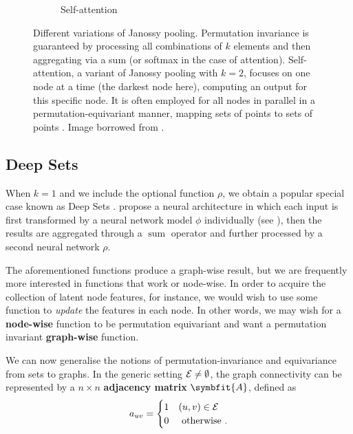 \begin{figure}[th]
\begin{subfigure}[h]{0.46\textwidth}
		\vspace{-0.8cm}
		\caption{Self-attention}
		\label{fig:Janossy_K2Att}
	\end{subfigure} 
	\caption{Different variations of Janossy pooling. Permutation invariance is guaranteed by processing all combinations of $k$ elements and then aggregating via a sum (or softmax in the case of attention). Self-attention, a variant of Janossy pooling with $k=2$, focuses on one node at a time (the darkest node here), computing an output for this specific node. It is often employed for all nodes in parallel in a permutation-equivariant manner, mapping sets of points to sets of points \parencite{Lee2018}. Image borrowed from \textcite{wagstaff2022universal}.}
	\label{fig:k12}
\end{figure}

\subsection{Deep Sets}\label{ssec:deep-sets}

When $k=1$ and we include the optional function $\rho$, we obtain a popular special case known as Deep Sets \parencite{zaheer2017deep}. \citeauthor{zaheer2017deep} propose a neural architecture in which each input is first transformed by a neural network model $\phi$ individually (see ), then the results are aggregated through a $\operatorname{sum}$ operator and further processed by a second neural network $\rho$.

The aforementioned functions produce a  graph-wise result, but we are frequently more interested in functions that work  or node-wise. In order to acquire the collection of latent node features, for instance, we would wish to use some function to \textit{update} the features in each node. In other words, we may wish for a \textbf{node-wise} function to be permutation equivariant and want a permutation invariant \textbf{graph-wise} function.

We can now generalise the notions of permutation-invariance and equivariance from sets to graphs. In the generic setting $\mathcal{E} \neq \emptyset$, the graph connectivity can be represented by a $n \times n$ \textbf{adjacency matrix} $\symbfit{A}$, defined as
\begin{equation}
    \label{eqn:adj-matrix-def}
    a_{u v}= \begin{cases}1 & (u, v) \in \mathcal{E} \\ 0 & \text { otherwise }.\end{cases}
\end{equation}

